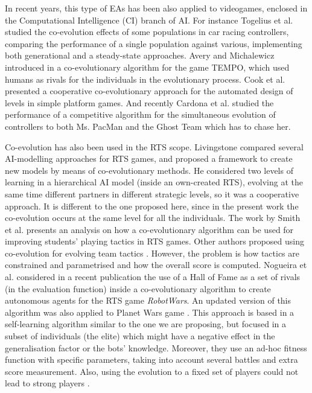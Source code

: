 \documentclass[conference]{IEEEtran}
\begin{document}
In recent years, this type of EAs has been also applied to videogames, enclosed in the Computational Intelligence (CI) branch of AI.
For instance Togelius et al. \cite{Togelius_Cars2007} studied the co-evolution effects of some populations in car racing controllers, comparing the performance of a single population against various, implementing both generational and a steady-state approaches. Avery and Michalewicz introduced in \cite{Avery_Human2008} a co-evolutionary algorithm for the game TEMPO, which used humans as rivals for the individuals in the evolutionary process.
Cook et al. \cite{Cook_Platforming2012} presented a cooperative co-evolutionary approach for the automated design of levels in simple platform games. And recently Cardona et al. \cite{Cardona_MSPacman2013} studied the performance of a competitive algorithm for the simultaneous evolution of controllers to both Ms. PacMan and the Ghost Team which has to chase her.

Co-evolution has also been used in the RTS scope. Livingstone \cite{Livinstone_RTS2005} compared several AI-modelling approaches for RTS games, and proposed a framework to create new models by means of co-evolutionary methods. He considered two levels of learning in a hierarchical AI model (inside an own-created RTS), evolving at the same time different partners in different strategic levels, so it was a cooperative approach. It is different to the one proposed here, since in the present work the co-evolution occurs at the same level for all the individuals.
The work by Smith et al. \cite{Smith_RTS_SpatialTactics2010} presents an analysis on how a co-evolutionary algorithm can be used for improving students' playing tactics in RTS games. Other authors proposed using co-evolution for evolving team tactics \cite{Avery_RTS_Team2010}. However, the problem is how tactics are constrained and parametrised and how the overall score is computed.
Nogueira et al. \cite{Nogueira_HoF2013} considered in a recent
publication the use of a Hall of Fame as a set of rivals (in the
evaluation function) inside a co-evolutionary algorithm to create
autonomous agents for the RTS game {\em RobotWars}. An updated version of this algorithm was also applied to Planet Wars game \cite{NogueiraCoevolutionary14}. This approach is based in a self-learning algorithm similar to the one we are proposing, but focused in a subset of individuals (the elite) which might have a negative effect in the generalisation factor or the bots' knowledge. Moreover, they use an ad-hoc fitness function with specific parameters, taking into account several battles and extra score measurement. Also, using the evolution to a fixed set of players could not lead to strong players \cite{Coevolving13Samothrakis}.
\end{document}

